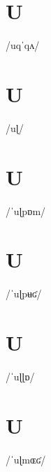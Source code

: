 \documentclass[10pt,a4paper,twoside]{book}
\begin{document}
\section*{U}

\begin{multicols}{3}
 {/uqˈqʌ/} {}
\end{multicols}

\section*{U}

\begin{multicols}{3}
 {/uɭ/} {}
\end{multicols}

\section*{U}

\begin{multicols}{3}
 {/ˈuɭpɒm/} {}
\end{multicols}

\section*{U}

\begin{multicols}{3}
 {/ˈuɭpʉʛ/} {}
\end{multicols}

\section*{U}

\begin{multicols}{3}
 {/ˈuɭɭɒ/} {}
\end{multicols}

\section*{U}

\begin{multicols}{3}
 {/ˈuɭmɶʛ/} {}
\end{multicols}
\end{document}
